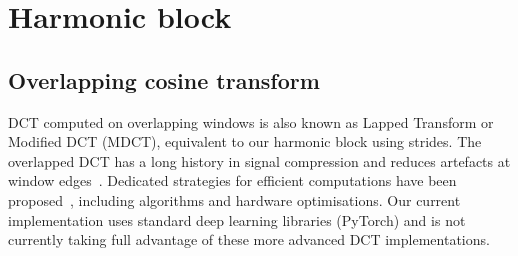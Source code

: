 \documentclass[conference]{IEEEtran}
\begin{document}
\section{Harmonic block}
\label{sec:trans}

\subsection{Overlapping cosine transform} \label{sec:overlap_dct}

DCT computed on overlapping windows is also known as Lapped Transform or Modified DCT (MDCT), equivalent to our harmonic block using strides. The overlapped DCT has a long history in signal compression and reduces artefacts at window edges~\cite{Tran03}. Dedicated strategies for efficient computations have been proposed~\cite{Tran03}, including algorithms and hardware optimisations. Our current implementation uses standard deep learning libraries (PyTorch) and is not currently taking full advantage of these more  advanced  DCT implementations. 
\end{document}
